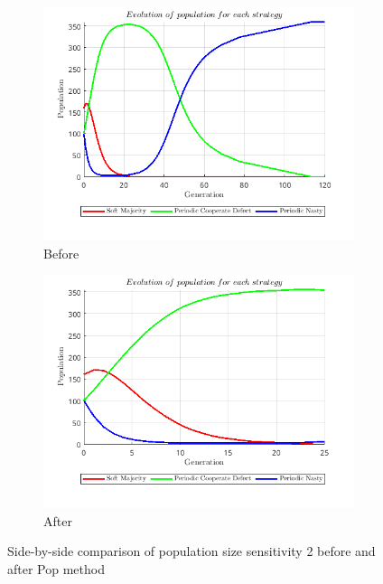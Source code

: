\documentclass[12pt]{report}
\begin{document}
\begin{figure}[H]
    \centering
    \begin{subfigure}[t]{0.45\textwidth}
        \centering
        \includegraphics[width=\textwidth]{population_size_sensitivity_2_before_pop.png}
        \caption{Before}
    \end{subfigure}
    \hfill
    \begin{subfigure}[t]{0.45\textwidth}
        \centering
        \includegraphics[width=\textwidth]{population_size_sensitivity_2_after_pop.png}
        \caption{After}
    \end{subfigure}
    \caption{Side-by-side comparison of population size sensitivity 2 before and after Pop method}
\end{figure}
\end{document}
